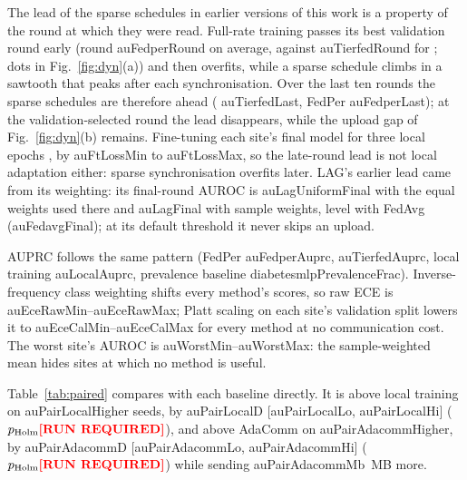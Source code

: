 The lead of the sparse schedules in earlier versions of this work is a property of the round at which they were read. Full-rate training passes its best validation round early (round \num{auFedperRound} on average, against \num{auTierfedRound} for \tierfed{}; dots in Fig.~\ref{fig:dyn}(a)) and then overfits, while a sparse schedule climbs in a sawtooth that peaks after each synchronisation. Over the last ten rounds the sparse schedules are therefore ahead (\tierfed{} \num{auTierfedLast}, FedPer \num{auFedperLast}); at the validation-selected round the lead disappears, while the upload gap of Fig.~\ref{fig:dyn}(b) remains. Fine-tuning each site's final model for three local epochs , by \num{auFtLossMin} to \num{auFtLossMax}, so the late-round lead is not local adaptation either: sparse synchronisation overfits later. LAG's earlier lead came from its weighting: its final-round AUROC is \num{auLagUniformFinal} with the equal weights used there and \num{auLagFinal} with sample weights, level with FedAvg (\num{auFedavgFinal}); at its default threshold it never skips an upload.

AUPRC follows the same pattern (FedPer \num{auFedperAuprc}, \tierfed{} \num{auTierfedAuprc}, local training \num{auLocalAuprc}, prevalence baseline \num{diabetesmlpPrevalenceFrac}). Inverse-frequency class weighting shifts every method's scores, so raw ECE is \num{auEceRawMin}--\num{auEceRawMax}; Platt scaling on each site's validation split lowers it to \num{auEceCalMin}--\num{auEceCalMax} for every method at no communication cost. The worst site's AUROC is \num{auWorstMin}--\num{auWorstMax}: the sample-weighted mean hides sites at which no method is useful.

\begin{table}[t]
\caption{\tierfed{} against every baseline of Table~\ref{tab:main}, paired over 10 seeds: AUROC difference with bootstrap 95\% interval, Holm-corrected Wilcoxon $p$, seeds on which \tierfed{} is strictly higher, and upload difference (MB)}
\label{tab:paired}
\centering\footnotesize
{}
\end{table}

Table~\ref{tab:paired} compares \tierfed{} with each baseline directly. It is above local training on \num{auPairLocalHigher} seeds, by \num{auPairLocalD} [\num{auPairLocalLo}, \num{auPairLocalHi}] ($p_{\mathrm{Holm}}\num{auPairLocalP}$), and above AdaComm on \num{auPairAdacommHigher}, by \num{auPairAdacommD} [\num{auPairAdacommLo}, \num{auPairAdacommHi}] ($p_{\mathrm{Holm}}\num{auPairAdacommP}$) while sending \num{auPairAdacommMb}~MB more. 

